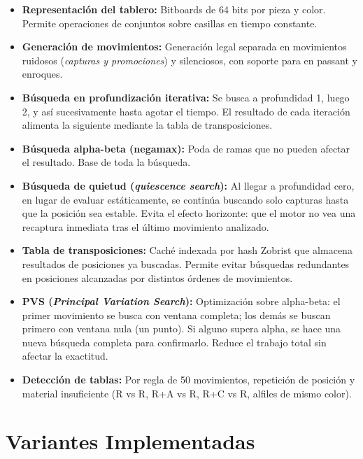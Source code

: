 \documentclass[12pt]{article}
\begin{document}
\begin{itemize}
    \item \textbf{Representación del tablero:} Bitboards de 64 bits por pieza y color. Permite operaciones de conjuntos sobre casillas en tiempo constante.
    \item \textbf{Generación de movimientos:} Generación legal separada en movimientos ruidosos (\textit{capturas y promociones}) y silenciosos, con soporte para en passant y enroques.
    \item \textbf{Búsqueda en profundización iterativa:} Se busca a profundidad 1, luego 2, y así sucesivamente hasta agotar el tiempo. El resultado de cada iteración alimenta la siguiente mediante la tabla de transposiciones.
    \item \textbf{Búsqueda alpha-beta (negamax):} Poda de ramas que no pueden afectar el resultado. Base de toda la búsqueda.
    \item \textbf{Búsqueda de quietud (\textit{quiescence search}):} Al llegar a profundidad cero, en lugar de evaluar estáticamente, se continúa buscando solo capturas hasta que la posición sea estable. Evita el efecto horizonte: que el motor no vea una recaptura inmediata tras el último movimiento analizado.
    \item \textbf{Tabla de transposiciones:} Caché indexada por hash Zobrist que almacena resultados de posiciones ya buscadas. Permite evitar búsquedas redundantes en posiciones alcanzadas por distintos órdenes de movimientos.
    \item \textbf{PVS (\textit{Principal Variation Search}):} Optimización sobre alpha-beta: el primer movimiento se busca con ventana completa; los demás se buscan primero con ventana nula (un punto). Si alguno supera alpha, se hace una nueva búsqueda completa para confirmarlo. Reduce el trabajo total sin afectar la exactitud.
    \item \textbf{Detección de tablas:} Por regla de 50 movimientos, repetición de posición y material insuficiente (R vs R, R+A vs R, R+C vs R, alfiles de mismo color).
\end{itemize}

\section{Variantes Implementadas}
\end{document}
